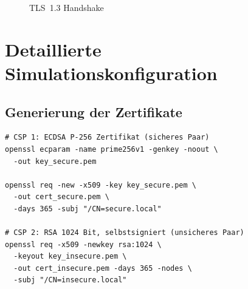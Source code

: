 \begin{figure}[htp]
{
}
\caption{TLS~1.3 Handshake}
\label{fig:tls13-handshake}
\end{figure}


\section{Detaillierte Simulationskonfiguration}
\label{app:simulation-config}


\subsection*{Generierung der Zertifikate}
\begin{lstlisting}[style=consolestyle]
# CSP 1: ECDSA P-256 Zertifikat (sicheres Paar)
openssl ecparam -name prime256v1 -genkey -noout \
  -out key_secure.pem

openssl req -new -x509 -key key_secure.pem \
  -out cert_secure.pem \
  -days 365 -subj "/CN=secure.local"

# CSP 2: RSA 1024 Bit, selbstsigniert (unsicheres Paar)
openssl req -x509 -newkey rsa:1024 \ 
  -keyout key_insecure.pem \
  -out cert_insecure.pem -days 365 -nodes \
  -subj "/CN=insecure.local"
\end{lstlisting}

